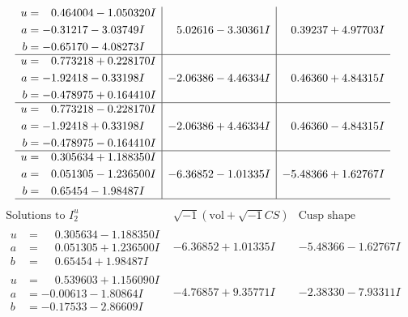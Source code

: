 \documentclass[1p]{elsarticle_modified}
\theoremstyle{definition}
\newcommand{\I}{\sqrt{-1}}
\begin{document}
$$\begin{array}{c|c|c}
\begin{aligned}
u &= \phantom{-}0.464004 - 1.050320 I \\
a &= -0.31217 - 3.03749 I \\
b &= -0.65170 - 4.08273 I\end{aligned}
 & \phantom{-}5.02616 - 3.30361 I & \phantom{-}0.39237 + 4.97703 I \\ \hline\begin{aligned}
u &= \phantom{-}0.773218 + 0.228170 I \\
a &= -1.92418 - 0.33198 I \\
b &= -0.478975 + 0.164410 I\end{aligned}
 & -2.06386 - 4.46334 I & \phantom{-}0.46360 + 4.84315 I \\ \hline\begin{aligned}
u &= \phantom{-}0.773218 - 0.228170 I \\
a &= -1.92418 + 0.33198 I \\
b &= -0.478975 - 0.164410 I\end{aligned}
 & -2.06386 + 4.46334 I & \phantom{-}0.46360 - 4.84315 I \\ \hline\begin{aligned}
u &= \phantom{-}0.305634 + 1.188350 I \\
a &= \phantom{-}0.051305 - 1.236500 I \\
b &= \phantom{-}0.65454 - 1.98487 I\end{aligned}
 & -6.36852 - 1.01335 I & -5.48366 + 1.62767 I\\
 \hline 
 \end{array}$$\newpage$$\begin{array}{c|c|c}  
\text{Solutions to }I^u_{2}& \I (\text{vol} + \sqrt{-1}CS) & \text{Cusp shape}\\
 \hline 
\begin{aligned}
u &= \phantom{-}0.305634 - 1.188350 I \\
a &= \phantom{-}0.051305 + 1.236500 I \\
b &= \phantom{-}0.65454 + 1.98487 I\end{aligned}
 & -6.36852 + 1.01335 I & -5.48366 - 1.62767 I \\ \hline\begin{aligned}
u &= \phantom{-}0.539603 + 1.156090 I \\
a &= -0.00613 - 1.80864 I \\
b &= -0.17533 - 2.86609 I\end{aligned}
 & -4.76857 + 9.35771 I & -2.38330 - 7.93311 I \\ \hline\begin{aligned}

\end{aligned}
\end{array}$$
\end{document}
